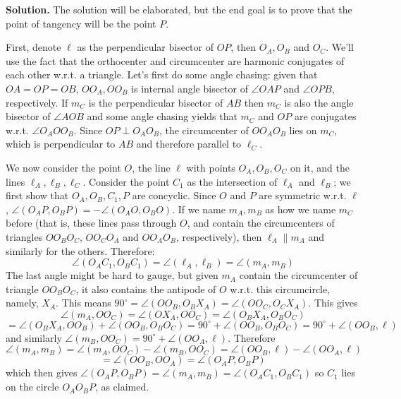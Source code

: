 \documentclass[11pt,a4paper]{article}
\begin{document}
\begin{enumerate}
	\textbf{Solution.} The solution will be elaborated, but the end goal is to prove that the point of tangency will be the point $P$. 
	
	First, denote $\ell$ as the perpendicular bisector of $OP$, then $O_A, O_B$ and $O_C$. 
	We'll use the fact that the orthocenter and circumcenter are harmonic conjugates of each other w.r.t. a triangle. 
	Let's first do some angle chasing: given that $OA=OP=OB$, $OO_A, OO_B$ is internal angle bisector of $\angle OAP$ and $\angle OPB$, respectively. 
	If $m_C$ is the perpendicular bisector of $AB$ then $m_C$ is also the angle bisector of $\angle AOB$ and some angle chasing yields that $m_C$ and $OP$ are conjugates w.r.t. $\angle O_AOO_B$. 
	Since $OP\perp O_AO_B$, the circumcenter of $OO_AO_B$ lies on $m_C$, which is perpendicular to $AB$ and therefore parallel to $\ell_C$. 
	
	We now consider the point $O$, the line $\ell$ with points $O_A, O_B, O_C$ on it, and the lines $\ell_A, \ell_B, \ell_C$. Consider the point $C_1$ as the intersection of $\ell_A$ and $\ell_B$; we first show that $O_A, O_B, C_1, P$ are concyclic. Since $O$ and $P$ are symmetric w.r.t. $\ell$, $\angle(O_AP, O_BP)=-\angle(O_AO, O_BO)$. If we name $m_A, m_B$ as how we name $m_C$ before (that is, these lines pass through $O$, and contain the circumcenters of triangles $OO_BO_C$, $OO_CO_A$ and $OO_AO_B$, respectively), then $\ell_A\parallel m_A$ and similarly for the others. Therefore: 
	\[
	\angle(O_AC_1, O_BC_1)=\angle(\ell_A, \ell_B)=\angle(m_A, m_B)
	\]
	The last angle might be hard to gauge, but given $m_A$ contain the circumcenter of triangle $OO_BO_C$, it also contains the antipode of $O$ w.r.t. this circumcircle, namely, $X_A$. This means $90^{\circ}=\angle(OO_B, O_BX_A)=\angle(OO_C, O_CX_A)$. This gives
	\[
	\angle(m_A, OO_C)
	=\angle(OX_A, OO_C)
	=\angle(O_BX_A, O_BO_C)
	\]\[
	=\angle(O_BX_A, OO_B)+\angle(OO_B, O_BO_C)
	=90^{\circ}+\angle(OO_B, O_BO_C)
	=90^{\circ}+\angle(OO_B, \ell)
	\]
	and similarly $\angle(m_B, OO_C)=90^{\circ}+\angle(OO_A, \ell)$. Therefore 
	\[
	\angle(m_A, m_B)
	=\angle(m_A, OO_C)-\angle(m_B, OO_C)
	=\angle(OO_B, \ell)-\angle(OO_A, \ell)
	\]\[
	=\angle(OO_B, OO_A)
	=\angle(O_AP, O_BP)
	\]
	which then gives $\angle(O_AP, O_BP)=\angle(m_A, m_B)=\angle(O_AC_1, O_BC_1)$ so $C_1$ lies on the circle $O_AO_BP$, as claimed. 
	

\end{enumerate}
\end{document}
